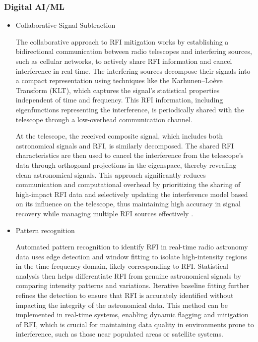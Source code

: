 \subsubsection{Digital AI/ML}
\begin{itemize}
\item Collaborative Signal Subtraction

The collaborative approach to RFI mitigation works by establishing a bidirectional communication between radio telescopes and interfering sources, such as cellular networks, to actively share RFI information and cancel interference in real time. The interfering sources decompose their signals into a compact representation using techniques like the Karhunen–Loève Transform (KLT), which captures the signal's statistical properties independent of time and frequency. This RFI information, including eigenfunctions representing the interference, is periodically shared with the telescope through a low-overhead communication channel.

At the telescope, the received composite signal, which includes both astronomical signals and RFI, is similarly decomposed. The shared RFI characteristics are then used to cancel the interference from the telescope’s data through orthogonal projections in the eigenspace, thereby revealing clean astronomical signals. This approach significantly reduces communication and computational overhead by prioritizing the sharing of high-impact RFI data and selectively updating the interference model based on its influence on the telescope, thus maintaining high accuracy in signal recovery while managing multiple RFI sources effectively \citep{chakraborty2023collaboration,chakraborty2024low}.

\item Pattern recognition

Automated pattern recognition to identify RFI in real-time radio astronomy data \citep{Winkel_2007} uses edge detection and window fitting to isolate high-intensity regions in the time-frequency domain, likely corresponding to RFI. Statistical analysis then helps differentiate RFI from genuine astronomical signals by comparing intensity patterns and variations. Iterative baseline fitting further refines the detection to ensure that RFI is accurately identified without impacting the integrity of the astronomical data. This method can be implemented in real-time systems, enabling dynamic flagging and mitigation of RFI, which is crucial for maintaining data quality in environments prone to interference, such as those near populated areas or satellite systems.


\end{itemize}
